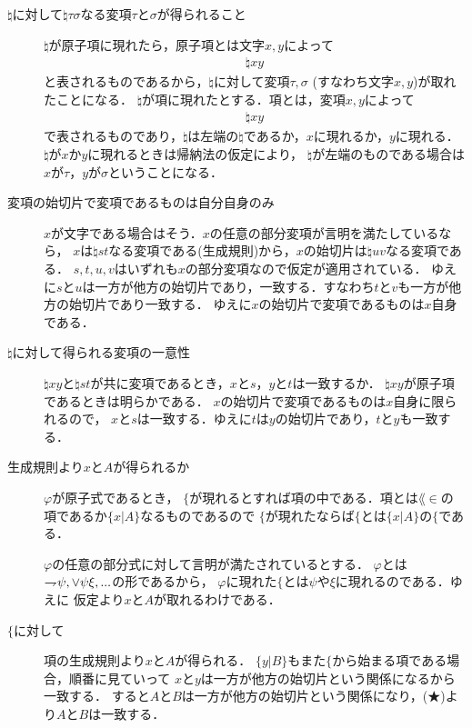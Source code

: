 	\begin{description}
		\item[$\natural$に対して$\natural \tau \sigma$なる変項$\tau$と$\sigma$が得られること]
			$\natural$が原子項に現れたら，原子項とは文字$x,y$によって
			\begin{align}
				\natural xy
			\end{align}
			と表されるものであるから，$\natural$に対して変項$\tau,\sigma$ (すなわち文字$x,y$)が取れたことになる．
			$\natural$が項に現れたとする．項とは，変項$x,y$によって
			\begin{align}
				\natural xy
			\end{align}
			で表されるものであり，$\natural$は左端の$\natural$であるか，$x$に現れるか，$y$に現れる．
			$\natural$が$x$か$y$に現れるときは帰納法の仮定により，
			$\natural$が左端のものである場合は$x$が$\tau$，$y$が$\sigma$ということになる．
			
		\item[変項の始切片で変項であるものは自分自身のみ]
			$x$が文字である場合はそう．$x$の任意の部分変項が言明を満たしているなら，
			$x$は$\natural st$なる変項である(生成規則)から，$x$の始切片は$\natural uv$なる変項である．
			$s,t,u,v$はいずれも$x$の部分変項なので仮定が適用されている．
			ゆえに$s$と$u$は一方が他方の始切片であり，一致する．すなわち$t$と$v$も一方が他方の始切片であり一致する．
			ゆえに$x$の始切片で変項であるものは$x$自身である．
			
		\item[$\natural$に対して得られる変項の一意性]
			$\natural xy$と$\natural st$が共に変項であるとき，$x$と$s$，$y$と$t$は一致するか．
			$\natural xy$が原子項であるときは明らかである．
			$x$の始切片で変項であるものは$x$自身に限られるので，
			$x$と$s$は一致する．ゆえに$t$は$y$の始切片であり，$t$と$y$も一致する．
		
		\item[生成規則より$x$と$A$が得られるか]
			$\varphi$が原子式であるとき，
			$\{$が現れるとすれば項の中である．項とは$\lang{\in}$の項であるか$\{x|A\}$なるものであるので
			$\{$が現れたならば$\{$とは$\{x|A\}$の$\{$である．
			
			$\varphi$の任意の部分式に対して言明が満たされているとする．
			$\varphi$とは$\rightharpoondown\hspace{-0.25em} \psi,\vee \psi \xi,...$の形であるから，
			$\varphi$に現れた$\{$とは$\psi$や$\xi$に現れるのである．ゆえに
			仮定より$x$と$A$が取れるわけである．
			
		\item[$\{$に対して]
			項の生成規則より$x$と$A$が得られる．
			$\{y|B\}$もまた$\{$から始まる項である場合，順番に見ていって
			$x$と$y$は一方が他方の始切片という関係になるから一致する．
			すると$A$と$B$は一方が他方の始切片という関係になり，(★)より$A$と$B$は一致する．
			

\end{description}
